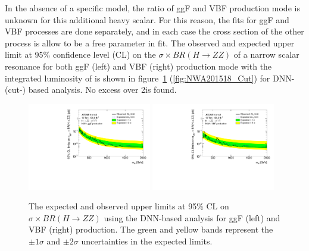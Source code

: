 In the absence of a specific model, the ratio of ggF and VBF production mode is unknown for this additional heavy scalar.
For this reason, the fits for ggF and VBF processes are done separately, and in each case the cross section of the other process is allow to be a free parameter in fit.
The observed and expected upper limit at 95\% confidence level (CL) on the $\sigma \times BR(H \rightarrow ZZ)$ of a narrow scalar resonance for both ggF (left) and VBF (right) production mode with the integrated luminosity of \lumi is shown in figure~\ref{fig:NWA201518_DNN} (\ref{fig:NWA201518_Cut}) for DNN- (cut-) based analysis.
No excess over 2\sigma is found.

\begin{figure}[h]
    \centering
    \includegraphics[width=0.48\textwidth]{figures/HMHZZ/results/4l_dnn_ggF.pdf}
    \includegraphics[width=0.48\textwidth]{figures/HMHZZ/results/4l_dnn_VBF.pdf}
    \caption{The expected and observed upper limits at 95\% CL on $\sigma \times BR(H \rightarrow ZZ)$ using the DNN-based analysis for ggF (left) and VBF (right) production. The green and yellow bands represent the $\pm 1\sigma$ and $\pm 2\sigma$ uncertainties in the expected limits.
 }
    \label{fig:NWA201518_DNN}
\end{figure}

